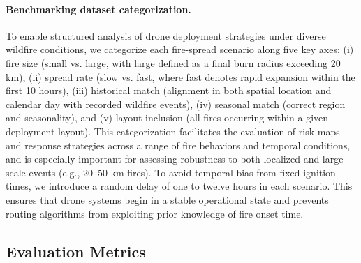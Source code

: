 \documentclass{article}
\newcommand{\ana}[1]{\textcolor{purple}{#1}}
\begin{document}
\paragraph{Benchmarking dataset categorization.}  
To enable structured analysis of drone deployment strategies under diverse wildfire conditions, we categorize each fire-spread scenario along five key axes: (i) fire size (small vs. large, with large defined as a final burn radius exceeding 20 km), (ii) spread rate (slow vs. fast, where fast denotes rapid expansion within the first 10 hours), (iii) historical match (alignment in both spatial location and calendar day with recorded wildfire events), (iv) seasonal match (correct region and seasonality), and (v) layout inclusion (all fires occurring within a given deployment layout). This categorization facilitates the evaluation of risk maps and response strategies across a range of fire behaviors and temporal conditions, and is especially important for assessing robustness to both localized and large-scale events (e.g., 20–50 km fires)\citep{WildfireriskXu2024}. To avoid temporal bias from fixed ignition times, we introduce a random delay of one to twelve hours in each scenario. This ensures that drone systems begin in a stable operational state and prevents routing algorithms from exploiting prior knowledge of fire onset time.




\subsection{Evaluation Metrics}\label{subsec:evaluationmetrics}


\end{document}
